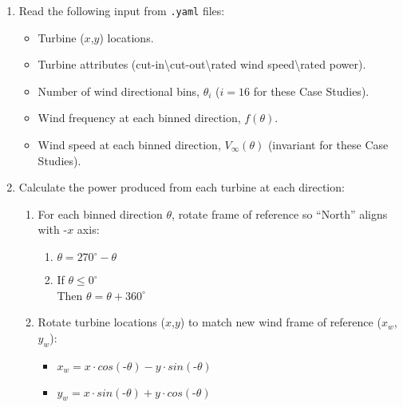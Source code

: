 \documentclass[12pt]{article}
\begin{document}
    \begin{enumerate}[parsep=0pt,partopsep=0pt]
        \item Read the following input from \texttt{.yaml} files:
            \begin{itemize}[noitemsep,topsep=0pt,parsep=0pt,partopsep=0pt]
                \item Turbine ($x$,$y$) locations.
                \item Turbine attributes (cut-in\textbackslash cut-out\textbackslash rated wind speed\textbackslash rated power).
                \item Number of wind directional bins, $\theta_{i}$ ($i=16$ for these Case Studies).
                \item Wind frequency at each binned direction, $f(\theta)$.
                \item Wind speed at each binned direction, $V_{\infty}(\theta)$ (invariant for these Case Studies).
            \end{itemize}
        \item Calculate the power produced from each turbine at each direction:
            \begin{enumerate}[noitemsep,topsep=0pt,parsep=0pt,partopsep=0pt]
                \item For each binned direction $\theta$, rotate frame of reference so ``North'' aligns with $\texttt{-}x$ axis:
                    \begin{enumerate}[leftmargin=+2.5em]
                    \setlength{\itemindent}{-.75em}
                        \item $\theta = 270^{\circ} - \theta $
                        \item If $\theta \leq 0^{\circ}$ \\
                                Then $\theta = \theta + 360^{\circ}$
                    \end{enumerate}
                \item Rotate turbine locations ($x$,$y$) to match new wind frame of reference ($x_w$,$y_w$):
                    \begin{itemize}[noitemsep,topsep=0pt,parsep=0pt,partopsep=0pt]
                        \item $x_w = x \cdot cos(\texttt{-}\theta) - y \cdot sin(\texttt{-}\theta)$
                        \item $y_w = x \cdot sin(\texttt{-}\theta) + y\cdot cos(\texttt{-}\theta)$
                    \end{itemize}

\end{enumerate}
\end{enumerate}
\end{document}
